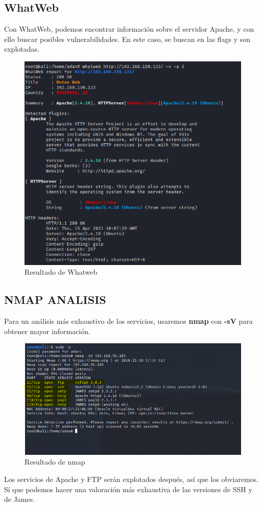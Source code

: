 \documentclass[12pt,twoside]{article}
\begin{document}
\subsection{WhatWeb}
Con WhatWeb, podemos encontrar información sobre el servidor Apache, y con ello buscar posibles vulnerabilidades. En este caso, se buscan en las flags y son explotadas.

\begin{figure}[h]
    \centering
    \includegraphics[scale=0.3]{./imagenes/whatweb}
    \caption{Resultado de Whatweb}
\end{figure}

\subsection{NMAP ANALISIS}
Para un análisis más exhaustivo de los servicios, usaremos \textbf{nmap} con \textbf{-sV} para obtener mayor información.
\begin{figure}[h]
    \centering
    \includegraphics[scale=0.7]{./imagenes/nmap_maquina}
    \caption{Resultado de nmap}
\end{figure}
Los servicios de Apache y FTP serán explotados después, así que los obviaremos. Sí que podemos hacer una valoración más exhaustiva de las versiones de SSH y de James.
\end{document}
